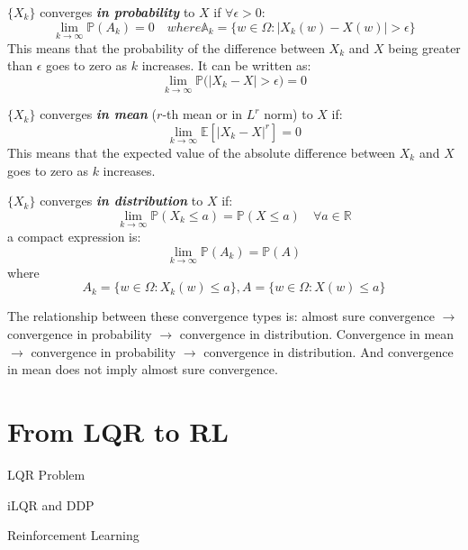 \documentclass[10pt]{elegantbook}
\newcommand{\mydefination}[1]{\textbf{\textit{\textcolor{structurecolor}{#1}}}}
\begin{document}
\begin{definition}
    $\{ X_k \}$ converges \mydefination{in probability} to $X$ if $\forall \epsilon > 0$:
    \[ \lim_{k \rightarrow \infty} \mathbb P(A_k) = 0 \quad where  \mathbb A_k = \{ w \in \Omega : |X_k(w) - X(w)| > \epsilon \} \]
    This means that the probability of the difference between $X_k$ and $X$ being greater than $\epsilon$ goes to zero as $k$ increases.
    It can be written as:
    \[ \lim_{k \rightarrow \infty} \mathbb P \big ( |X_k - X| > \epsilon \big ) = 0 \]
\end{definition}

\begin{definition}
    $\{ X_k \}$ converges \mydefination{in mean} ($r$-th mean or in $L^r$ norm) to $X$ if:
    \[ \lim_{k \rightarrow \infty} \mathbb E[|X_k - X|^r] = 0 \]
    This means that the expected value of the absolute difference between $X_k$ and $X$ goes to zero as $k$ increases.
\end{definition}

\begin{definition}
    $\{ X_k \}$ converges \mydefination{in distribution} to $X$ if:
    \[ \lim_{k \rightarrow \infty} \mathbb P(X_k \leq a) = \mathbb P(X \leq a) \quad \forall a \in \mathbb R \]
    a compact expression is:
    \[ \lim_{k \rightarrow \infty} \mathbb P(A_k) = \mathbb P(A) \]
    where
    \[ A_k = \{ w \in \Omega : X_k(w) \leq a \}, A = \{ w \in \Omega : X(w) \leq a \} \]
\end{definition}

The relationship between these convergence types is:
almost sure convergence $\rightarrow$ convergence in probability $\rightarrow$ convergence in distribution.
Convergence in mean $\rightarrow$ convergence in probability $\rightarrow$ convergence in distribution.
And convergence in mean does not imply almost sure convergence.



\chapter{From LQR to RL}

\begin{introduction}
    \item LQR Problem
    \item iLQR and DDP
    \item Reinforcement Learning
\end{introduction}
\end{document}
